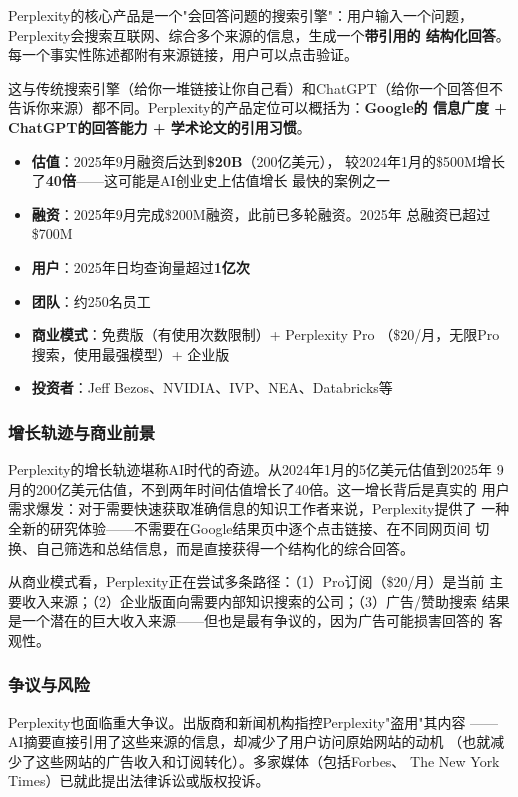 Perplexity的核心产品是一个"会回答问题的搜索引擎"：用户输入一个问题，
Perplexity会搜索互联网、综合多个来源的信息，生成一个\textbf{带引用的
结构化回答}。每一个事实性陈述都附有来源链接，用户可以点击验证。

这与传统搜索引擎（给你一堆链接让你自己看）和ChatGPT（给你一个回答但不
告诉你来源）都不同。Perplexity的产品定位可以概括为：\textbf{Google的
信息广度 + ChatGPT的回答能力 + 学术论文的引用习惯}。

\begin{keybox}[Perplexity核心数据（截至2025年底）]
\begin{itemize}
  \item \textbf{估值}：2025年9月融资后达到\textbf{\$20B}（200亿美元），
    较2024年1月的\$500M增长了\textbf{40倍}——这可能是AI创业史上估值增长
    最快的案例之一
  \item \textbf{融资}：2025年9月完成\$200M融资，此前已多轮融资。2025年
    总融资已超过\$700M
  \item \textbf{用户}：2025年日均查询量超过\textbf{1亿次}
  \item \textbf{团队}：约250名员工
  \item \textbf{商业模式}：免费版（有使用次数限制）+ Perplexity Pro
    （\$20/月，无限Pro搜索，使用最强模型）+ 企业版
  \item \textbf{投资者}：Jeff Bezos、NVIDIA、IVP、NEA、Databricks等
\end{itemize}
\end{keybox}

\subsubsection{增长轨迹与商业前景}
Perplexity的增长轨迹堪称AI时代的奇迹。从2024年1月的5亿美元估值到2025年
9月的200亿美元估值，不到两年时间估值增长了40倍。这一增长背后是真实的
用户需求爆发：对于需要快速获取准确信息的知识工作者来说，Perplexity提供了
一种全新的研究体验——不需要在Google结果页中逐个点击链接、在不同网页间
切换、自己筛选和总结信息，而是直接获得一个结构化的综合回答。

从商业模式看，Perplexity正在尝试多条路径：（1）Pro订阅（\$20/月）是当前
主要收入来源；（2）企业版面向需要内部知识搜索的公司；（3）广告/赞助搜索
结果是一个潜在的巨大收入来源——但也是最有争议的，因为广告可能损害回答的
客观性。

\subsubsection{争议与风险}
Perplexity也面临重大争议。出版商和新闻机构指控Perplexity"盗用"其内容
——AI摘要直接引用了这些来源的信息，却减少了用户访问原始网站的动机
（也就减少了这些网站的广告收入和订阅转化）。多家媒体（包括Forbes、
The New York Times）已就此提出法律诉讼或版权投诉。

